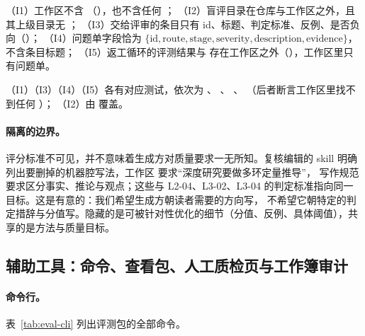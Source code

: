 \begin{invariant}[评测信息隔离]
\label{inv:eval-isolation}
（I1）工作区不含 （），也不含任何 ；
（I2）盲评目录在仓库与工作区之外，且其上级目录无 ；
（I3）交给评审的条目只有 id、标题、判定标准、反例、是否负向（）；
（I4）问题单字段恰为 $\{\text{id},\text{route},\text{stage},\text{severity},\text{description},\text{evidence}\}$，不含条目标题；
（I5）返工循环的评测结果与  存在工作区之外（），工作区里只有问题单。
\end{invariant}
\begin{sloppypar}
（I1）（I3）（I4）（I5）各有对应测试，依次为
、
、
、
（后者断言工作区里找不到任何 ）；
（I2）由  覆盖。
\end{sloppypar}

\paragraph{隔离的边界。}
评分标准不可见，并不意味着生成方对质量要求一无所知。复核编辑的 skill 明确列出要删掉的机器腔写法，工作区  要求“深度研究要做多环定量推导”，
写作规范要求区分事实、推论与观点；这些与 L2-04、L3-02、L3-04 的判定标准指向同一目标。这是有意的：我们希望生成方朝读者需要的方向写，
不希望它朝特定的判定措辞与分值写。隐藏的是可被针对性优化的细节（分值、反例、具体阈值），共享的是方法与质量目标。

\subsection{辅助工具：命令、查看包、人工质检页与工作簿审计}
\label{sec:eval-tools}

\paragraph{命令行。}
表~\ref{tab:eval-cli} 列出评测包的全部命令。

